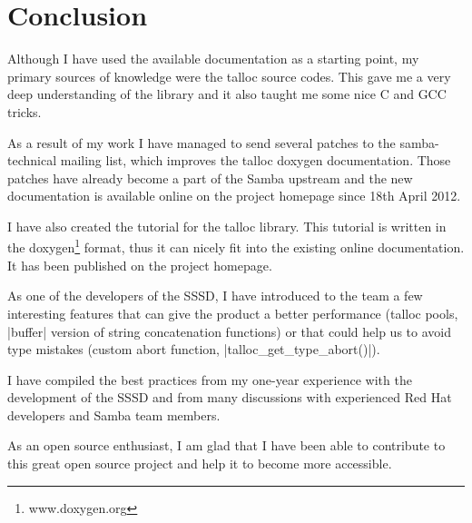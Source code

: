 \chapter{Conclusion}

Although I have used the available documentation as a starting point, my primary
sources of knowledge were the talloc source codes. This gave me a very deep
understanding of the library and it also taught me some nice C and GCC tricks.

As a result of my work I have managed to send several patches to the
samba-technical mailing list, which improves the talloc doxygen documentation.
Those patches have already become a part of the Samba upstream and the new
documentation is available online on the project homepage since 18th April 2012.

I have also created the tutorial for the talloc library. This tutorial is
written in the doxygen\footnote{www.doxygen.org} format, thus it can nicely
fit into the existing online documentation. It has been published on the project
homepage.

As one of the developers of the SSSD, I have introduced to the team a few
interesting features that can give the product a better performance (talloc
pools, |buffer| version of string concatenation functions) or that could help
us to avoid type mistakes (custom abort function, |talloc_get_type_abort()|).

I have compiled the best practices from my one-year experience with the
development of the SSSD and from many discussions with experienced Red Hat
developers and Samba team members.

As an open source enthusiast, I am glad that I have been able to contribute to
this great open source project and help it to become more accessible.
